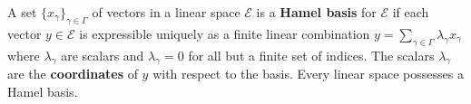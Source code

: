 A set $\{x_\gamma\}_{\gamma \in \Gamma}$ of vectors in a linear space $\mathcal{E}$ is a \textbf{Hamel basis} for $\mathcal{E}$ if each vector $y \in \mathcal{E}$ is expressible uniquely as a finite linear combination $y = \sum_{\gamma \in \Gamma} \lambda_\gamma x_\gamma$ where $\lambda_\gamma$ are scalars and $\lambda_\gamma = 0$ for all but a finite set of indices. The scalars $\lambda_\gamma$ are the \textbf{coordinates} of $y$ with respect to the basis. Every linear space possesses a Hamel basis.
